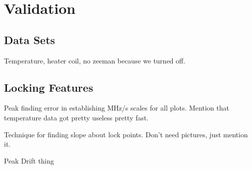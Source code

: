 \newpage
\section{Validation}

\subsection{Data Sets}

Temperature, heater coil, no zeeman because we turned off.

\subsection{Locking Features}

Peak finding error in establishing MHz/s scales for all plots. Mention that temperature data got pretty useless pretty fast.

Technique for finding slope about lock points. Don't need pictures, just mention it.

Peak Drift thing
